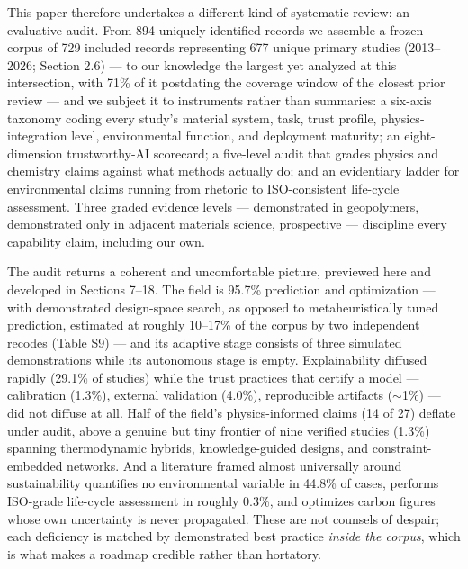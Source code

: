 \documentclass[pdflatex,sn-basic]{sn-jnl}
\begin{document}
This paper therefore undertakes a different kind of systematic review: an evaluative audit. From 894 uniquely identified records we assemble a frozen corpus of 729 included records representing 677 unique primary studies (2013--2026; Section 2.6) --- to our knowledge the largest yet analyzed at this intersection, with 71\% of it postdating the coverage window of the closest prior review --- and we subject it to instruments rather than summaries: a six-axis taxonomy coding every study's material system, task, trust profile, physics-integration level, environmental function, and deployment maturity; an eight-dimension trustworthy-AI scorecard; a five-level audit that grades physics and chemistry claims against what methods actually do; and an evidentiary ladder for environmental claims running from rhetoric to ISO-consistent life-cycle assessment. Three graded evidence levels --- demonstrated in geopolymers, demonstrated only in adjacent materials science, prospective --- discipline every capability claim, including our own.

The audit returns a coherent and uncomfortable picture, previewed here and developed in Sections 7--18. The field is 95.7\% prediction and optimization --- with demonstrated design-space search, as opposed to metaheuristically tuned prediction, estimated at roughly 10--17\% of the corpus by two independent recodes (Table S9) --- and its adaptive stage consists of three simulated demonstrations while its autonomous stage is empty. Explainability diffused rapidly (29.1\% of studies) while the trust practices that certify a model --- calibration (1.3\%), external validation (4.0\%), reproducible artifacts ($\sim$1\%) --- did not diffuse at all. Half of the field's physics-informed claims (14 of 27) deflate under audit, above a genuine but tiny frontier of nine verified studies (1.3\%) spanning thermodynamic hybrids, knowledge-guided designs, and constraint-embedded networks. And a literature framed almost universally around sustainability quantifies no environmental variable in 44.8\% of cases, performs ISO-grade life-cycle assessment in roughly 0.3\%, and optimizes carbon figures whose own uncertainty is never propagated. These are not counsels of despair; each deficiency is matched by demonstrated best practice \emph{inside the corpus}, which is what makes a roadmap credible rather than hortatory.
\end{document}
